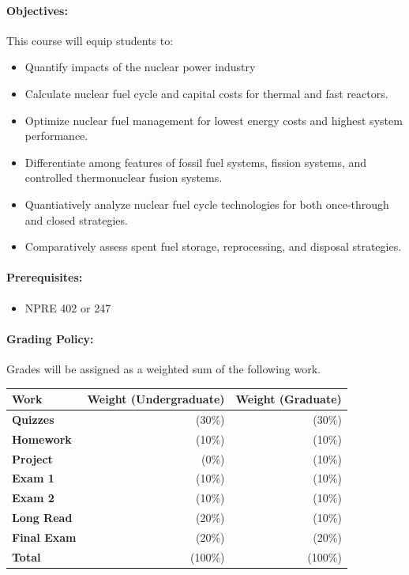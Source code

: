 \documentclass[11pt, a4paper]{article}
\begin{document}
\paragraph{Objectives:} 

This course will equip students to:

\begin{itemize}
\item Quantify impacts of the nuclear power industry
\item Calculate nuclear fuel cycle and capital costs for thermal and fast reactors.
\item Optimize nuclear fuel management for lowest energy costs and highest system performance.
\item Differentiate among features of fossil fuel systems, fission systems, and controlled thermonuclear fusion systems.
\item Quantiatively analyze nuclear fuel cycle technologies for both once-through and closed strategies.
\item Comparatively assess spent fuel storage, reprocessing, and disposal strategies.
\end{itemize}

\paragraph{Prerequisites:} 
\begin{itemize}
\item NPRE 402 or 247
\end{itemize}

\paragraph{Grading Policy:} Grades will be assigned as a weighted sum of the 
following work.

\begin{table}[h]
\begin{tabularx}{\textwidth}{Xrr}
        \textbf{Work} & \textbf{Weight (Undergraduate)} & \textbf{Weight (Graduate)} \\
\hline
\textbf{Quizzes}           & (30\%)   & (30\%)\\
\textbf{Homework}          & (10\%)   & (10\%)\\
\textbf{Project}           & (0\%)    & (10\%)\\
\textbf{Exam 1}            & (10\%)   & (10\%)\\
\textbf{Exam 2}            & (10\%)   & (10\%)\\
\textbf{Long Read}         & (20\%)   & (10\%)\\
\textbf{Final Exam}        & (20\%)   & (20\%)\\
\hline
\textbf{Total}             & (100\%) & (100\%)\\
\end{tabularx}
\end{table}
\end{document}
